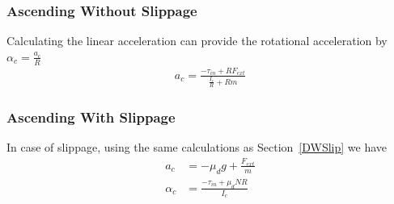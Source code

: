 \documentclass[letterpaper, 10pt, conference]{ieeeconf}
\begin{document}
\subsubsection{Ascending Without Slippage}
Calculating the linear acceleration can provide the rotational acceleration by $\alpha_c = \frac{a_c}{R}$
\begin{align}
a_c = \frac{-\tau_{in} + R F_{ext}}{\frac{I_c}{R} + Rm}
\end{align}

\subsubsection{Ascending With Slippage}
In case of slippage, using the same calculations as Section~\ref{DWSlip} we have
\begin{align}
a_c &= -\mu_dg + \frac{F_{ext}}{m} \\
\alpha_c &= \frac{-\tau_{in} + \mu_d N R}{I_c}
\end{align}
\end{document}

